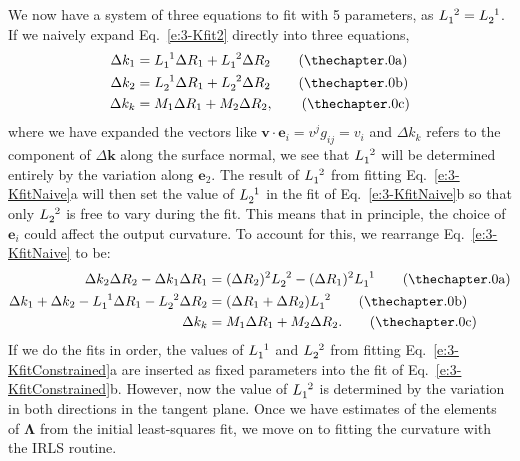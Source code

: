 We now have a system of three equations to fit with 5 parameters, as $\tensor{L}{_1^2} = \tensor{L}{_2^1}$.
If we naively expand Eq.~\ref{e:3-Kfit2} directly into three equations,
\label{e:3-KfitNaive}
\begin{align}
  \Delta k_1 &= \tensor{L}{_1^1} \Delta R_1 + \tensor{L}{_1^2} \Delta R_2\tag{\theequation a} \\
  \Delta k_2 &= \tensor{L}{_2^1} \Delta R_1 + \tensor{L}{_2^2} \Delta R_2\tag{\theequation b} \\
  \Delta k_k &= M_1 \Delta R_1 + M_2 \Delta R_2,\tag{\theequation c}
\end{align}
where we have expanded the vectors like $\mathbf{v}\cdot \mathbf{e}_i = v^j g_{ij} = v_i$ and $\Delta k_k$ refers to the component of $\Delta \mathbf{k}$ along the surface normal, we see that $\tensor{L}{_1^2}$ will be determined entirely by the variation along $\mathbf{e}_2$.
The result of $\tensor{L}{_1^2}$ from fitting Eq.~\ref{e:3-KfitNaive}a will then set the value of $\tensor{L}{_2^1}$ in the fit of Eq.~\ref{e:3-KfitNaive}b so that only $\tensor{L}{_2^2}$ is free to vary during the fit.
This means that in principle, the choice of $\mathbf{e}_i$ could affect the output curvature.
To account for this, we rearrange Eq.~\ref{e:3-KfitNaive} to be:
\label{e:3-KfitConstrained}
\begin{align}
  \Delta k_2 \Delta R_2 - \Delta k_1 \Delta R_1 &= (\Delta R_2)^2 \tensor{L}{_2^2} - (\Delta R_1)^2 \tensor{L}{_1^1}\tag{\theequation a}\\
  \Delta k_1 + \Delta k_2 - \tensor{L}{_1^1} \Delta R_1 - \tensor{L}{_2^2} \Delta R_2 &= (\Delta R_1 + \Delta R_2)\tensor{L}{_1^2}\tag{\theequation b}\\
  \Delta k_k &= M_1 \Delta R_1 + M_2 \Delta R_2.\tag{\theequation c}
\end{align}
If we do the fits in order, the values of $\tensor{L}{_1^1}$ and $\tensor{L}{_2^2}$ from fitting Eq.~\ref{e:3-KfitConstrained}a are inserted as fixed parameters into the fit of Eq.~\ref{e:3-KfitConstrained}b.
However, now the value of $\tensor{L}{_1^2}$ is determined by the variation in both directions in the tangent plane.
Once we have estimates of the elements of $\bm{\Lambda}$ from the initial least-squares fit, we move on to fitting the curvature with the IRLS routine. \\

